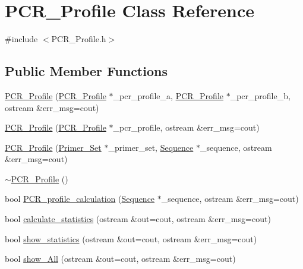 \hypertarget{class_p_c_r___profile}{}\section{P\+C\+R\+\_\+\+Profile Class Reference}
\label{class_p_c_r___profile}


{\ttfamily \#include $<$P\+C\+R\+\_\+\+Profile.\+h$>$}

\subsection*{Public Member Functions}
\begin{DoxyCompactItemize}
\item 
\mbox{\hyperlink{class_p_c_r___profile_a3b52a78e4b4db8f2c571aaf66bf9a2cc}{P\+C\+R\+\_\+\+Profile}} (\mbox{\hyperlink{class_p_c_r___profile}{P\+C\+R\+\_\+\+Profile}} $\ast$\+\_\+pcr\+\_\+profile\+\_\+a, \mbox{\hyperlink{class_p_c_r___profile}{P\+C\+R\+\_\+\+Profile}} $\ast$\+\_\+pcr\+\_\+profile\+\_\+b, ostream \&err\+\_\+msg=cout)
\item 
\mbox{\hyperlink{class_p_c_r___profile_a4b621dd306d51186d84ac65929f14e7b}{P\+C\+R\+\_\+\+Profile}} (\mbox{\hyperlink{class_p_c_r___profile}{P\+C\+R\+\_\+\+Profile}} $\ast$\+\_\+pcr\+\_\+profile, ostream \&err\+\_\+msg=cout)
\item 
\mbox{\hyperlink{class_p_c_r___profile_a2772873e5a43e8b8c1dde4b6ca9d8a2f}{P\+C\+R\+\_\+\+Profile}} (\mbox{\hyperlink{class_primer___set}{Primer\+\_\+\+Set}} $\ast$\+\_\+primer\+\_\+set, \mbox{\hyperlink{class_sequence}{Sequence}} $\ast$\+\_\+sequence, ostream \&err\+\_\+msg=cout)
\item 
\mbox{\hyperlink{class_p_c_r___profile_a0e83f85f3689ebd7c07005dd8440b185}{$\sim$\+P\+C\+R\+\_\+\+Profile}} ()
\item 
bool \mbox{\hyperlink{class_p_c_r___profile_a339a01da69e5e709f6b33678bd9f73dc}{P\+C\+R\+\_\+profile\+\_\+calculation}} (\mbox{\hyperlink{class_sequence}{Sequence}} $\ast$\+\_\+sequence, ostream \&err\+\_\+msg=cout)
\item 
bool \mbox{\hyperlink{class_p_c_r___profile_a6f209d643d15a15c7a7b940e18df9497}{calculate\+\_\+statistics}} (ostream \&out=cout, ostream \&err\+\_\+msg=cout)
\item 
bool \mbox{\hyperlink{class_p_c_r___profile_a9897676b415905e30809e69c399a859a}{show\+\_\+statistics}} (ostream \&out=cout, ostream \&err\+\_\+msg=cout)
\item 
bool \mbox{\hyperlink{class_p_c_r___profile_aad744529e3bbcdc019d259667460340b}{show\+\_\+\+All}} (ostream \&out=cout, ostream \&err\+\_\+msg=cout)

\end{DoxyCompactItemize}
